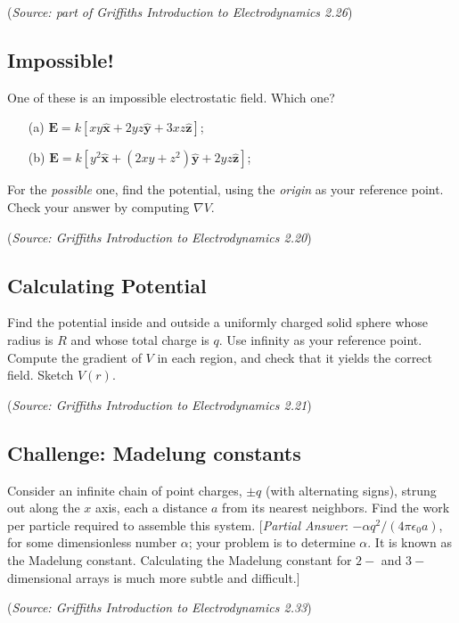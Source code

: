 \documentclass{article}
\begin{document}
(\textit{Source: part of Griffiths Introduction to Electrodynamics 2.26})

\subsection{Impossible!}

One of these is an impossible electrostatic field. Which one?
\begin{itemize}
	\item[(a)] $\mathbf{E}=k[xy\hat{\mathbf{x}}+2yz\hat{\mathbf{y}}+3xz\hat{\mathbf{z}}]$;
	\item[(b)] $\mathbf{E}=k[y^2\hat{\mathbf{x}}+(2xy+z^2)\hat{\mathbf{y}}+2yz\hat{\mathbf{z}}]$;
\end{itemize}
For the \textit{possible} one, find the potential, using the \textit{origin} as your reference point. Check your answer by computing $\nabla V$.

(\textit{Source: Griffiths Introduction to Electrodynamics 2.20})

\subsection{Calculating Potential}

Find the potential inside and outside a uniformly charged solid sphere whose radius is $R$ and whose total charge is $q$. Use infinity as your reference point. Compute the gradient of $V$ in each region, and check that it yields the correct field. Sketch $V(r)$.

(\textit{Source: Griffiths Introduction to Electrodynamics 2.21})

\subsection{Challenge: Madelung constants}

Consider an infinite chain of point charges, $\pm q$ (with alternating signs), strung out along the $x$ axis, each a distance $a$ from its nearest neighbors. Find the work per particle required to assemble this system. [\textit{Partial Answer}: $-\alpha q^2/(4\pi\epsilon_0 a)$, for some dimensionless number $\alpha$; your problem is to determine $\alpha$. It is known as the Madelung constant. Calculating the Madelung constant for $2-$ and $3-$dimensional arrays is much more subtle and difficult.]

(\textit{Source: Griffiths Introduction to Electrodynamics 2.33})
\end{document}
